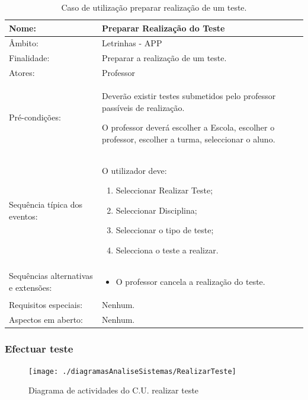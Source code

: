 \documentclass[a4paper]{article}
\begin{document}
					\begin{table}[h]
							\begin{tabular}{|p{2cm} p{10cm}|}
								\hline Nome: & Preparar Realização do Teste \\ 
								\hline Âmbito: & Letrinhas - APP \\ 
								\hline Finalidade: & Preparar a realização de um teste. \\ 
								\hline Atores: & Professor \\ 
							    \hline Pré-condições: & Deverão existir testes submetidos pelo  professor passíveis de realização.

								O professor deverá escolher a  Escola, escolher o professor, escolher a turma, seleccionar o aluno.
								 \\ 
							    \hline Sequência típica dos eventos: &  					
								O utilizador deve:
	    					\begin{enumerate}
							    \item	Seleccionar Realizar Teste;
								\item	Seleccionar Disciplina;
								\item	Seleccionar o tipo de teste;
								\item	Selecciona o teste a realizar.
						    \end{enumerate}  \\
								    \hline Sequências alternativas e extensões: & 
								    \begin{itemize}			    	
								  				    	\item O professor cancela a realização do teste.
								    \end{itemize}
								     \\ 
								    \hline Requisitos especiais: & Nenhum.\\ 
								    \hline Aspectos em aberto: & Nenhum. \\
													\hline 
							\end{tabular}
							\caption{Caso de utilização preparar realização de um teste.}
						\end{table} 
\newpage
					\subsubsection{Efectuar teste}
				
				
				\begin{figure}[h]
					\centering
					\texttt{[image: ./diagramasAnaliseSistemas/RealizarTeste]}
					\caption{Diagrama de actividades do C.U. realizar teste}
					\label{fig:RealizarTeste}
					\end{figure}
\end{document}
